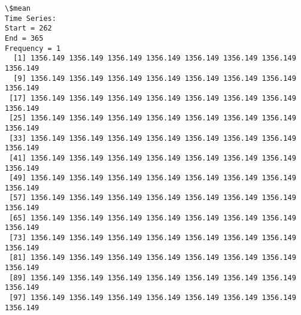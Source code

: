 \documentclass[11pt]{article}
\begin{document}
    \begin{Verbatim}[commandchars=\\\{\}]
\$mean
Time Series:
Start = 262 
End = 365 
Frequency = 1 
  [1] 1356.149 1356.149 1356.149 1356.149 1356.149 1356.149 1356.149 1356.149
  [9] 1356.149 1356.149 1356.149 1356.149 1356.149 1356.149 1356.149 1356.149
 [17] 1356.149 1356.149 1356.149 1356.149 1356.149 1356.149 1356.149 1356.149
 [25] 1356.149 1356.149 1356.149 1356.149 1356.149 1356.149 1356.149 1356.149
 [33] 1356.149 1356.149 1356.149 1356.149 1356.149 1356.149 1356.149 1356.149
 [41] 1356.149 1356.149 1356.149 1356.149 1356.149 1356.149 1356.149 1356.149
 [49] 1356.149 1356.149 1356.149 1356.149 1356.149 1356.149 1356.149 1356.149
 [57] 1356.149 1356.149 1356.149 1356.149 1356.149 1356.149 1356.149 1356.149
 [65] 1356.149 1356.149 1356.149 1356.149 1356.149 1356.149 1356.149 1356.149
 [73] 1356.149 1356.149 1356.149 1356.149 1356.149 1356.149 1356.149 1356.149
 [81] 1356.149 1356.149 1356.149 1356.149 1356.149 1356.149 1356.149 1356.149
 [89] 1356.149 1356.149 1356.149 1356.149 1356.149 1356.149 1356.149 1356.149
 [97] 1356.149 1356.149 1356.149 1356.149 1356.149 1356.149 1356.149 1356.149


\end{Verbatim}
\end{document}
